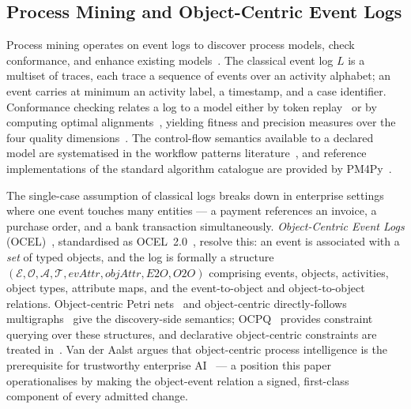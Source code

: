 \subsection{Process Mining and Object-Centric Event Logs}
\label{sec:bg-pm}

Process mining operates on event logs to discover process models, check
conformance, and enhance existing
models~\cite{van_der_aalst_process_mining_2011,van_der_aalst_2016_process_mining}.
The classical event log $L$ is a multiset of traces, each trace a sequence of
events over an activity alphabet; an event carries at minimum an activity label,
a timestamp, and a case identifier. Conformance checking relates a log to a
model either by token replay~\cite{rozinat_van_der_aalst_2008} or by computing
optimal alignments~\cite{adriansyah_et_al_alignments_2011,adriansyah_2014_phd},
yielding fitness and precision measures over the four quality
dimensions~\cite{buijs_et_al_quality_dimensions_2012}. The control-flow
semantics available to a declared model are systematised in the workflow
patterns literature~\cite{russell_workflow_patterns_2015}, and reference
implementations of the standard algorithm catalogue are provided by
PM4Py~\cite{berti_pm4py_2023}.

The single-case assumption of classical logs breaks down in enterprise settings
where one event touches many entities --- a payment references an invoice, a
purchase order, and a bank transaction simultaneously. \emph{Object-Centric
Event Logs} (OCEL)~\cite{ghahfarokhi_et_al_ocel_2021}, standardised as
OCEL~2.0~\cite{berti_et_al_ocel2_spec_2024,ocel_2_standard_2023}, resolve this:
an event is associated with a \emph{set} of typed objects, and the log is
formally a structure
$(\mathcal{E}, \mathcal{O}, \mathcal{A}, \mathcal{T},
\textit{evAttr}, \textit{objAttr}, \textit{E2O}, \textit{O2O})$
comprising events, objects, activities, object types, attribute maps, and the
event-to-object and object-to-object relations. Object-centric Petri
nets~\cite{van_der_aalst_berti_2020} and object-centric directly-follows
multigraphs~\cite{berti_van_der_aalst_oc_dfg_2023} give the discovery-side
semantics; OCPQ~\cite{kuesters_van_der_aalst_ocpq_2025} provides constraint
querying over these structures, and declarative object-centric constraints are
treated in~\cite{kuesters_van_der_aalst_oc_declare_2025}. Van der Aalst argues
that object-centric process intelligence is the prerequisite for trustworthy
enterprise AI~\cite{van_der_aalst_no_ai_without_pi_2024} --- a position this
paper operationalises by making the object-event relation a signed, first-class
component of every admitted change.

